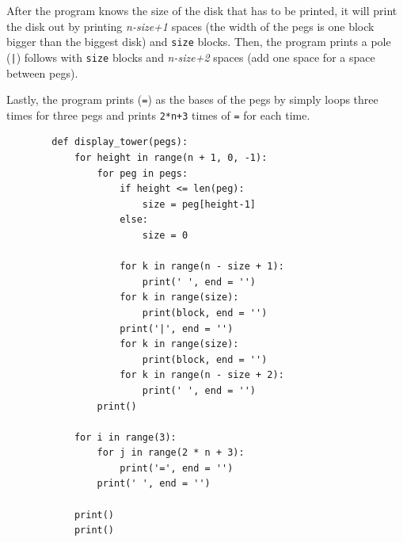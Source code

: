 \documentclass[12pt]{article}
\begin{document}
	After the program knows the size of the disk that has to be printed, it will print the disk out by printing \textit{n-size+1} spaces (the width of the pegs is one block bigger than the biggest disk) and \texttt{size} blocks. Then, the program prints a pole (\texttt{|}) follows with \texttt{size} blocks and \textit{n-size+2} spaces (add one space for a space between pegs).
	
	Lastly, the program prints (\texttt{=}) as the bases of the pegs by simply loops three times for three pegs and prints \texttt{2*n+3} times of \texttt{=} for each time.

	\begin{verbatim}
		def display_tower(pegs):
		    for height in range(n + 1, 0, -1):
		        for peg in pegs:
		            if height <= len(peg):
		                size = peg[height-1]
		            else:
		                size = 0

		            for k in range(n - size + 1):
		                print(' ', end = '')
		            for k in range(size):
		                print(block, end = '')
		            print('|', end = '')
		            for k in range(size):
		                print(block, end = '')
		            for k in range(n - size + 2):
		                print(' ', end = '')
		        print()

		    for i in range(3):
		        for j in range(2 * n + 3):
		            print('=', end = '')
		        print(' ', end = '')

		    print()
		    print()
	\end{verbatim}

	
\end{document}
